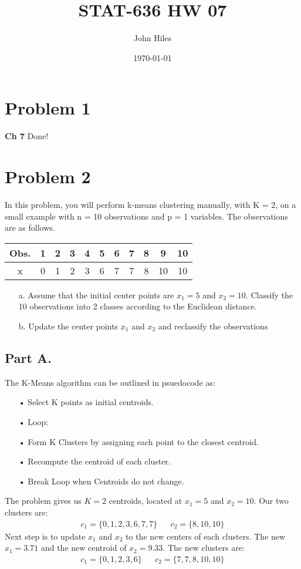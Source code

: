\documentclass{article}
\title{STAT-636 HW 07}
\author{John Hiles}
\date\today
\begin{document}
\maketitle %


\section*{Problem 1}
\textbf{Ch 7}
Done!

\section*{Problem 2}
In this problem, you will perform k-means clustering manually, with K = 2, on a small example
with n = 10 observations and p = 1 variables. The observations are as follows.
  \begin{tabular}{c|c|c|c|c|c|c|c|c|c|c}
    \hline
    \hline
    Obs. & 1 & 2 & 3 & 4 & 5 & 6 & 7 & 8 & 9 & 10\\
    \hline
    x & 0 & 1 & 2 & 3 & 6 & 7 & 7 & 8 & 10 & 10\\
    \hline
    \hline
  \end{tabular}
\begin{enumerate}
\item[a.] Assume that the initial center points are $x_1 = 5$ and $x_2 = 10$. Classify the 10 observations into 2 classes according to the Euclidean distance.
\item[b.] Update the center points $x_1$ and $x_2$ and reclassify the observations
\end{enumerate}
\subsection*{Part A.}
The K-Means algorithm can be outlined in psuedocode as:
\begin{enumerate}
\item[•] Select K points as initial centroids.
\item[•] Loop:
\item[•] Form K Clusters by assigning each point to the closest centroid.
\item[•] Recompute the centroid of each cluster.
\item[•] Break Loop when Centroids do not change.
\end{enumerate}
The problem gives us $K=2$ centroids, located at $x_1=5$ and $x_2=10$. Our two clusters are:
\begin{align*}
c_1 = \{0,1,2,3,6,7,7 \} && c_2 = \{ 8, 10, 10\}
\end{align*}
Next step is to update $x_1$ and $x_2$ to the new centers of each clusters. The new $x_1=3.71$ and the new centroid of $x_2=9.33$. The new clusters are:
\begin{align*}
\boxed{ c_1 = \{ 0,1,2,3,6 \} } && \boxed{ c_2 = \{ 7, 7, 8, 10, 10 \} }
\end{align*}
\end{document}
